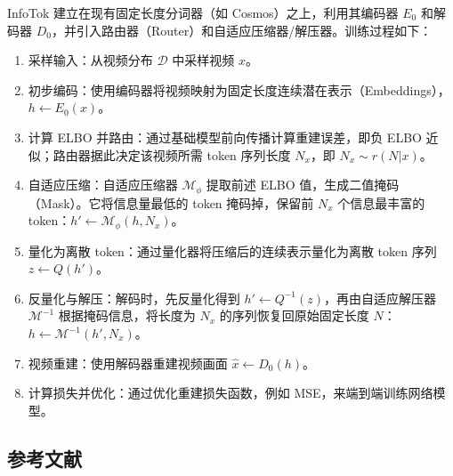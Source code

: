 InfoTok 建立在现有固定长度分词器（如 Cosmos）之上，利用其编码器 \(E_0\) 和解码器 \(D_0\)，并引入路由器（Router）和自适应压缩器/解压器。训练过程如下：

\begin{enumerate}
\def\labelenumi{\arabic{enumi}.}
\tightlist
\item
  采样输入：从视频分布 \(\mathcal{D}\) 中采样视频 \(x\)。
\item
  初步编码：使用编码器将视频映射为固定长度连续潜在表示（Embeddings），\(h\leftarrow E_0(x)\)。
\item
  计算 ELBO 并路由：通过基础模型前向传播计算重建误差，即负 ELBO 近似；路由器据此决定该视频所需 token 序列长度 \(N_x\)，即 \(N_x\sim r(N|x)\)。
\item
  自适应压缩：自适应压缩器 \(\mathcal{M}_\phi\) 提取前述 ELBO 值，生成二值掩码（Mask）。它将信息量最低的 token 掩码掉，保留前 \(N_x\) 个信息最丰富的 token：\(h'\leftarrow\mathcal{M}_\phi(h,N_x)\)。
\item
  量化为离散 token：通过量化器将压缩后的连续表示量化为离散 token 序列 \(z\leftarrow Q(h')\)。
\item
  反量化与解压：解码时，先反量化得到 \(h'\leftarrow Q^{-1}(z)\)，再由自适应解压器 \(\mathcal{M}^{-1}\) 根据掩码信息，将长度为 \(N_x\) 的序列恢复回原始固定长度 \(N\)：\(h\leftarrow \mathcal{M}^{-1}(h',N_x)\)。
\item
  视频重建：使用解码器重建视频画面 \(\hat{x}\leftarrow D_0(h)\)。
\item
  计算损失并优化：通过优化重建损失函数，例如 MSE，来端到端训练网络模型。
\end{enumerate}

\FloatBarrier
{}
\hypertarget{ux53c2ux8003ux6587ux732e-140}{%
\subsection{参考文献}\label{ux53c2ux8003ux6587ux732e-140}}

